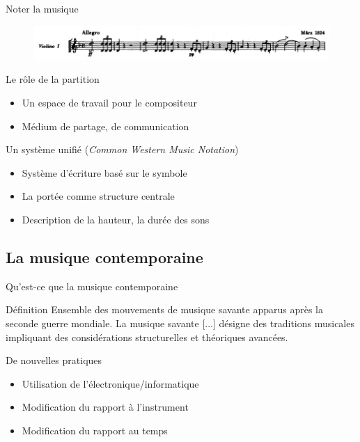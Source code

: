 \documentclass[pdf]{beamer}
\begin{document}
\begin{frame}{Noter la musique}
\begin{figure}
	\centering
	\includegraphics[keepaspectratio=true, width=\textwidth]{./medias/deathAndTheMaiden_extract2.jpg}
\end{figure}
\begin{block}{Le rôle de la partition} 
\begin{itemize}[label={$\square$}]
	\item Un espace de travail pour le compositeur
	\item Médium de partage, de communication
\end{itemize}
\end{block}
\begin{block}{Un système unifié (\textit{Common Western Music Notation})}
\begin{itemize}[label={$\square$}]
	\item Système d'écriture basé sur le symbole		
	\item La portée comme structure centrale
	\item Description de la hauteur, la durée des sons
\end{itemize}
\end{block}

\end{frame}

\subsection{La musique contemporaine}
\begin{frame}{Qu'est-ce que la musique contemporaine}

\begin{block}{Définition}
Ensemble des mouvements de musique savante apparus après la seconde guerre mondiale. La musique savante [...] désigne des traditions musicales impliquant des considérations structurelles et théoriques avancées.
\end{block}

\begin{block}{De nouvelles pratiques}
\begin{itemize}[label={$\square$}]
	\item Utilisation de l'électronique/informatique
	\item Modification du rapport à l'instrument
	\item Modification du rapport au temps
\end{itemize}
\end{block}		

\end{frame}
\end{document}
